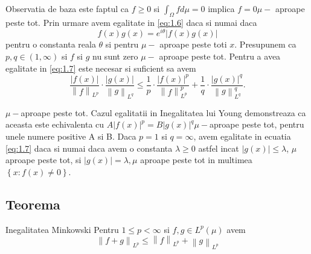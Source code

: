 \documentclass[a4paper,12pt,oneside]{report}
\begin{document}
Observatia de baza este faptul ca  \(f\geq 0\) si \(\int_{\Omega }f d\mu  = 0\) implica \(f = 0 \mu-\) aproape peste tot. 
	Prin urmare avem egalitate in \ref{eq:1.6} daca si numai daca 
\begin{displaymath}
  f\left ( x \right )g\left ( x \right ) = e^{i\theta }\left | f\left ( x \right ) g\left ( x \right )\right |
\end{displaymath}
pentru o constanta reala \(\theta\) si pentru \(\mu-\) aproape peste toti \(x\). 
	Presupunem ca \(p , q \in \left ( 1 , \infty  \right )\) si \(f\) si \(g\) nu sunt zero \(\mu-\) aproape peste tot. Pentru a avea egalitate in \ref{eq:1.7} este necesar si suficient sa avem 
\begin{displaymath}
  \frac{\left | f\left ( x \right ) \right |}{\left \| f \right \|_{L^{p}}} \cdot \frac{\left | g\left ( x \right ) \right |}{\left \| g \right \|_{L^{q}}}\leq \frac{1}{p}\cdot \frac{\left | f\left ( x \right ) \right |^{p}}{\left \| f \right \|^{p}_{L^{p}}} + \frac{1}{q}\cdot \frac{\left | g\left ( x \right ) \right |^{q}}{\left \| g \right \|^{q}_{L^{q}}}. 
\end{displaymath}

\(\mu-\)aproape peste tot. Cazul egalitatii in Inegalitatea lui Young demonstreaza ca aceasta este echivalenta cu \(A\left | f\left ( x \right ) \right |^{p} = B\left | g\left ( x \right ) \right |^{q} \mu-\)aproape peste tot,
pentru unele numere positive A si B. 
	Daca \(p = 1\) si \(q = \infty\), avem egalitate in ecuatia \ref{eq:1.7} daca si numai daca avem o constanta \(\lambda \geq 0\) astfel incat \(\left | g\left ( x \right ) \right |\leq \lambda\),  \(\mu\) aproape peste tot, si \(\left | g\left ( x \right ) \right |= \lambda,  \mu\) aproape peste tot in multimea \(\left \{ x : f\left ( x \right )\neq 0 \right \}\). 

\subsection{Teorema}
Inegalitatea Minkowski
Pentru \(1\leq  p < \infty\) si \(f , g \in L^{p}\left ( \mu  \right ) \) avem
\begin{displaymath}
  \left \| f + g  \right \|_{L^{p}}\leq \left \| f \right \|_{L^{p}} + \left \| g \right \|_{L^{p}} \label{eq:1.10} \tag{1.10}
\end{displaymath}
\end{document}
